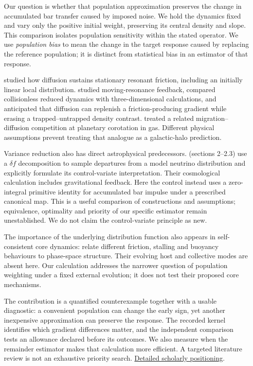 \documentclass[fleqn,usenatbib]{mnras}
\begin{document}
Our question is whether that population approximation preserves the change in accumulated bar transfer caused by imposed noise. We hold the dynamics fixed and vary only the positive initial weight, preserving its central density and slope. This comparison isolates population sensitivity within the stated operator. We use \emph{population bias} to mean the change in the target response caused by replacing the reference population; it is distinct from statistical bias in an estimator of that response.

\citet{Hamilton2023} studied how diffusion sustains stationary resonant friction, including an initially linear local distribution. \citet{Chiba2023} studied moving-resonance feedback, compared collisionless reduced dynamics with three-dimensional calculations, and anticipated that diffusion can replenish a friction-producing gradient while erasing a trapped--untrapped density contrast. \citet{OgilvieLubow2006} treated a related migration--diffusion competition at planetary corotation in gas. Different physical assumptions prevent treating that analogue as a galactic-halo prediction.

Variance reduction also has direct astrophysical predecessors. \citet{Elbers2021} (sections 2--2.3) use a \(\delta f\) decomposition to sample departures from a model neutrino distribution and explicitly formulate its control-variate interpretation. Their cosmological calculation includes gravitational feedback. Here the control instead uses a zero-integral primitive identity for accumulated bar impulse under a prescribed canonical map. This is a useful comparison of constructions and assumptions; equivalence, optimality and priority of our specific estimator remain unestablished. We do not claim the control-variate principle as new.

The importance of the underlying distribution function also appears in self-consistent core dynamics: \citet{Dattathri2026} relate different friction, stalling and buoyancy behaviours to phase-space structure. Their evolving host and collective modes are absent here. Our calculation addresses the narrower question of population weighting under a fixed external evolution; it does not test their proposed core mechanisms.

The contribution is a quantified counterexample together with a usable diagnostic: a convenient population can change the early sign, yet another inexpensive approximation can preserve the response. The recorded kernel identifies which gradient differences matter, and the independent comparison tests an allowance declared before its outcomes. We also measure when the remainder estimator makes that calculation more efficient. A targeted literature review is not an exhaustive priority search. \href{https://djova.ca/galaxy-bar/diagnostics/population-accuracy/SOURCES.md}{Detailed scholarly positioning}.
\end{document}
